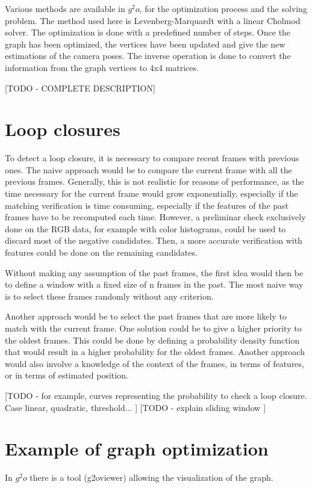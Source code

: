 Various methods are available in $g^2o$, for the optimization process and the solving problem. The method used here is Levenberg-Marquardt with a linear Cholmod solver. The optimization is done with a predefined number of steps. Once the graph has been optimized, the vertices have been updated and give the new estimations of the camera poses. The inverse operation is done to convert the information from the graph vertices to 4x4 matrices.

[TODO - COMPLETE DESCRIPTION]

\section{Loop closures}

To detect a loop closure, it is necessary to compare recent frames with previous ones. The naive approach would be to compare the current frame with all the previous frames. Generally, this is not realistic for reasons of performance, as the time necessary for the current frame would grow exponentially, especially if the matching verification is time consuming, especially if the features of the past frames have to be recomputed each time. However, a preliminar check exclusively done on the RGB data, for example with color histograms, could be used to discard most of the negative candidates. Then, a more accurate verification with features could be done on the remaining candidates.

Without making any assumption of the past frames, the first idea would then be to define a window with a fixed size of n frames in the past. The most naive way is to select these frames randomly without any criterion.

Another approach would be to select the past frames that are more likely to match with the current frame. One solution could be to give a higher priority to the oldest frames. This could be done by defining a probability density function that would result in a higher probability for the oldest frames. Another approach would also involve a knowledge of the context of the frames, in terms of features, or in terms of estimated position.

[TODO - for example, curves representing the probability to check a loop closure. Case linear, quadratic, threshold... ]
[TODO - explain sliding window ]

\section{Example of graph optimization}
In $g^2o$ there is a tool (g2oviewer) allowing the visualization of the graph.

